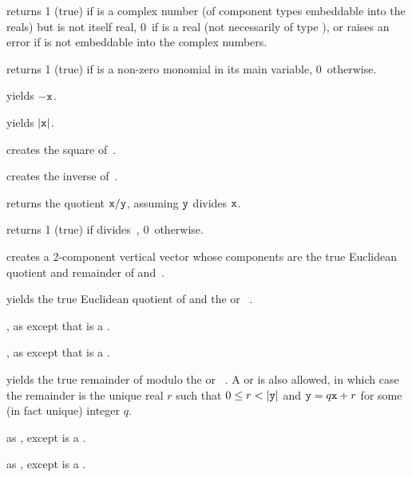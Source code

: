  returns 1 (true) if  is a complex number
(of component types embeddable into the reals) but is not itself real, 0~if
 is a real (not necessarily of type ), or raises an error if
 is not embeddable into the complex numbers.

 returns 1 (true) if  is a non-zero
monomial in its main variable, 0~otherwise.


 yields $-{\tt x}$.

 yields $|{\tt x}|$.

 creates the square of~.

 creates the inverse of~.


 returns the quotient ${\tt x} / {\tt y}$,
assuming ${\tt y}$ divides ${\tt x}$.

  returns 1 (true) if  divides~,
0~otherwise.

 creates a 2-component vertical
vector whose components are the true Euclidean quotient and remainder
of  and~.

 yields the true Euclidean
quotient of  and the  or ~.

, as 
except that  is a .

, as 
except that  is a .

 yields the true remainder of 
modulo the  or ~. A  or  
is also allowed, in which case the remainder is the unique real $r$ such that
$0 \leq r < |{\tt y}|$ and ${\tt y} = q{\tt x} + r$ for some (in fact unique)
integer $q$.

 as , except  is
a .

 as , except  is
a .

